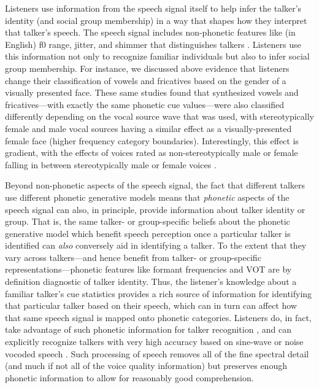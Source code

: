 Listeners use information from the speech signal itself to help infer the talker's identity (and social group membership) in a way that shapes how they interpret that talker's speech.  The speech signal includes non-phonetic features like (in English) f0 range, jitter, and shimmer that distinguishes talkers \autocite{Creel2011,Pardo2006}.  Listeners use this information not only to recognize familiar individuals but also to infer social group membership.  For instance, we discussed above evidence that listeners change their classification of vowels and fricatives based on the gender of a visually presented face.  These same studies found that synthesized vowels and fricatives---with exactly the same phonetic cue values---were also classified differently depending on the vocal source wave that was used, with stereotypically female and male vocal sources having a similar effect as a visually-presented female face (higher frequency category boundaries).  Interestingly, this effect is gradient, with the effects of voices rated as non-stereotypically male or female falling in between stereotypically male or female voices \autocite{Johnson1999,Munson2011a,Strand1996,Strand1999}.

Beyond non-phonetic aspects of the speech signal, the fact that different talkers use different phonetic generative models means that \emph{phonetic} aspects of the speech signal can also, in principle, provide information about talker identity or group.  That is, the same talker- or group-specific beliefs about the phonetic generative model which benefit speech perception once a particular talker is identified can \emph{also} conversely aid in identifying a talker.  To the extent that they vary across talkers---and hence benefit from talker- or group-specific representations---phonetic features like formant frequencies and VOT are by definition diagnostic of talker identity.  Thus, the listener's knowledge about a familiar talker's cue statistics provides a rich source of information for identifying that particular talker based on their speech, which can in turn can affect how that same speech signal is mapped onto phonetic categories.  Listeners do, in fact, take advantage of such phonetic information for talker recognition \autocite{Creel2011,Pardo2006}, and can explicitly recognize talkers with very high accuracy based on sine-wave \autocite{Remez1997} or noise vocoded speech \autocite{Sheffert2002}.  Such processing of speech removes all of the fine spectral detail (and much if not all of the voice quality information) but preserves enough phonetic information to allow for reasonably good comprehension.

